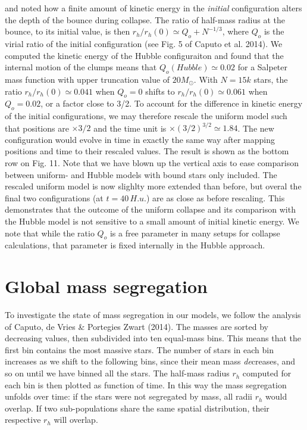 \cite{caputo14} and \cite{theis99} noted how a finite amount of kinetic energy in the {\it initial} configuration alters the  depth of the bounce during collapse. The ratio of half-mass radius at the bounce, to its initial value, is then $ r_h/r_h(0) \simeq Q_o + N^{-1/3}$, where $Q_o$ is the virial ratio of the initial configuration (see Fig. 5 of Caputo et al. 2014). We computed the kinetic energy of the  Hubble configuraiton and found that the internal motion of the clumps means that $Q_o (Hubble) \simeq 0.02$ for a Salpeter mass function with upper truncation value of $20 M_\odot$. With $N = 15k$ stars, the ratio $r_h/r_h(0) \simeq 0.041$ when $Q_o = 0$ shifts to $r_h/r_h(0) \simeq 0.061$ when $Q_o = 0.02$, or a factor close to 3/2. To account for the difference in kinetic energy of the initial configurations, we may therefore rescale the uniform model such that positions are  $ \times 3/2$ and the time unit is $\times (3/2)^{3/2} \simeq 1.84$. The new configuration would evolve in time in exactly the same way after mapping positions and time to their rescaled values. The result is shown as the bottom row on Fig. 11.  Note that we  have blown up the vertical axis to ease comparison between uniform- and Hubble models with bound stars only included. The rescaled uniform model is now slighlty more extended than before, but overal the final two configurations (at $t = 40 \,H.u.$) are as close as before rescaling. This demonstrates that  the outcome of the uniform collapse and its comparison with the Hubble model is not sensitive to a small amount of initial kinetic energy. We note that while the ratio $Q_o$ is a free parameter in many setups for collapse calculations, that parameter is fixed internally in the Hubble approach. 










\section{Global mass segregation}
\label{Sec:Segregation} 


To investigate the state of mass segregation in our models, we follow the analysis of Caputo, de Vries \& Portegies Zwart (2014). The masses are sorted by decreasing values, then subdivided into ten equal-mass bins. This means that the first bin contains the most massive stars. The number of stars in each bin increases as we shift to the following bins, since their mean mass {\it de}creases, and so on until we have binned all the stars. The half-mass radius $r_h$ computed for each bin is then plotted as function of time. In this way the mass segregation unfolds over time: if the stars were not segregated by mass, all radii $r_h$ would overlap. If two sub-populations share the same spatial distribution, their respective $r_h$ will overlap.

